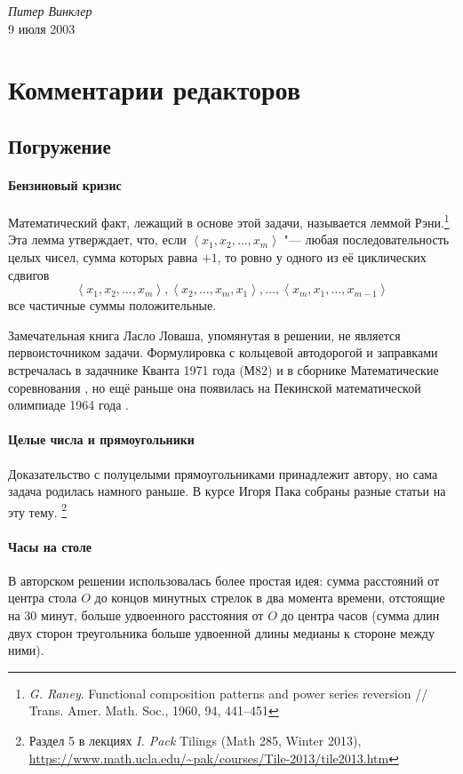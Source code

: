 \documentclass[twoside]{book}
\begin{document}
\begin{flushright}
\emph{Питер Винклер}
\\
9 июля 2003
\end{flushright}

\appendix

\chapter{Комментарии редакторов}

\section{Погружение}

\subsubsection*{Бензиновый кризис} %
Математический факт, лежащий в основе этой задачи, называется леммой Рэни.\footnote{\emph{G. Raney}. Functional composition patterns and power series reversion /\!/ Trans. Amer. Math. Soc., 1960, 94, 441--451}
Эта лемма утверждает, что, если 
$\left<x_1, x_2,\ldots, x_m\right>$ "--- любая последовательность целых чисел, сумма 
которых равна $+1$, то ровно у одного из её циклических сдвигов 
$$\left<x_1, x_2,\ldots , x_m\right>, \left<x_2, \ldots, x_m, x_1\right>, \ldots, \left<x_m, x_1, \ldots, x_{m-1}\right>$$
все частичные суммы  положительные. 

Замечательная книга Ласло Ловаша, упомянутая в решении, не является первоисточником задачи.
Формулировка с кольцевой автодорогой и заправками встречалась в задачнике Кванта 1971 года (М82)
и в сборнике Математические соревнования \cite[задачи 76 и 77]{матсоревнования}, но ещё раньше она появилась на Пекинской математической олимпиаде 1964 года \cite[№26.6]{зарубежные}.


\subsubsection*{Целые числа и прямоугольники} %
Доказательство с полуцелыми прямоугольниками принадлежит автору, но сама задача родилась намного раньше.
В курсе Игоря Пака собраны разные статьи на эту тему.%
\footnote{Раздел 5 в лекциях \emph{I. Pack} Tilings (Math 285, Winter 2013), \url{https://www.math.ucla.edu/~pak/courses/Tile-2013/tile2013.htm}}

\subsubsection*{Часы на столе} %
В авторском решении использовалась более простая идея: сумма расстояний от центра стола $O$ до концов минутных стрелок в два момента времени, отстоящие на 30 минут, больше удвоенного расстояния от $O$ до центра часов (сумма длин двух сторон треугольника больше удвоенной длины медианы к стороне между ними).
\end{document}
